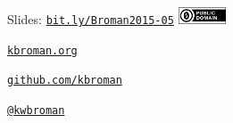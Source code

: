 \documentclass[12pt,t]{beamer}
\begin{document}
\begin{frame}[c]{}

\Large

Slides: \href{http://bit.ly/Broman2015-05}{\tt bit.ly/Broman2015-05} \quad
\includegraphics[height=5mm]{Figs/cc-zero.png}

\vspace{10mm}

\href{http://kbroman.org}{\tt kbroman.org}

\vspace{10mm}

\href{https://github.com/kbroman}{\tt github.com/kbroman}

\vspace{10mm}

\href{https://twitter.com/kwbroman}{\tt @kwbroman}


\note{
}
\end{frame}
\end{document}
